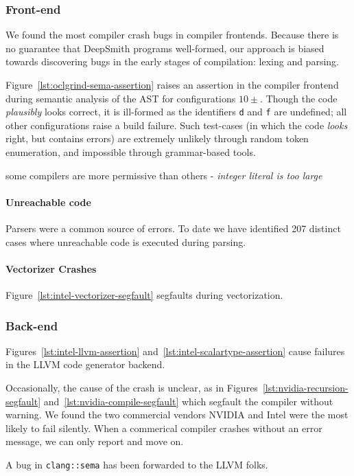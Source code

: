 \subsubsection{Front-end} We found the most compiler crash bugs in compiler frontends. Because there is no guarantee that DeepSmith programs well-formed, our approach is biased towards discovering bugs in the early stages of compilation: lexing and parsing.

Figure~\ref{lst:oclgrind-sema-assertion} raises an assertion in the compiler frontend during semantic analysis of the AST for configurations $10\pm$. Though the code \emph{plausibly} looks correct, it is ill-formed as the identifiers \texttt{d} and \texttt{f} are undefined; all other configurations raise a build failure. Such test-cases (in which the code \emph{looks} right, but contains errors) are extremely unlikely through random token enumeration, and impossible through grammar-based tools.

some compilers are more permissive than others - \emph{integer literal is too large}

\paragraph{Unreachable code} Parsers were a common source of errors. To date we have identified 207 distinct cases where unreachable code is executed during parsing.

\paragraph{Vectorizer Crashes} Figure~\ref{lst:intel-vectorizer-segfault} segfaults during vectorization.

\subsubsection{Back-end} Figures~\ref{lst:intel-llvm-assertion} and~\ref{lst:intel-scalartype-assertion} cause failures in the LLVM code generator backend.

Occasionally, the cause of the crash is unclear, as in Figures~\ref{lst:nvidia-recursion-segfault} and~\ref{lst:nvidia-compile-segfault} which segfault the compiler without warning. We found the two commercial vendors NVIDIA and Intel were the most likely to fail silently. When a commerical compiler crashes without an error message, we can only report and move on.

A bug in \texttt{clang::sema} has been forwarded to the LLVM folks.

